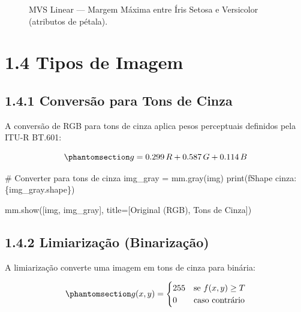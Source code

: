 \documentclass[
  portuguese,
  letterpaper,
  openany,
  oneside,
  12pt,
  a4paper]{book}
\newenvironment{Shaded}{\begin{snugshade}}{\end{snugshade}}
\newcommand{\BuiltInTok}[1]{\textcolor[rgb]{0.00,0.23,0.31}{#1}}
\newcommand{\CommentTok}[1]{\textcolor[rgb]{0.37,0.37,0.37}{#1}}
\newcommand{\NormalTok}[1]{\textcolor[rgb]{0.00,0.23,0.31}{#1}}
\newcommand{\OperatorTok}[1]{\textcolor[rgb]{0.37,0.37,0.37}{#1}}
\newcommand{\SpecialCharTok}[1]{\textcolor[rgb]{0.37,0.37,0.37}{#1}}
\newcommand{\SpecialStringTok}[1]{\textcolor[rgb]{0.13,0.47,0.30}{#1}}
\newcommand{\StringTok}[1]{\textcolor[rgb]{0.13,0.47,0.30}{#1}}
\begin{document}
\begin{tcolorbox}
\begin{figure}[H]
{}

\caption{\label{fig-1-lena}MVS Linear --- Margem Máxima entre Íris
Setosa e Versicolor (atributos de pétala).}

\end{figure}%

\section{1.4 Tipos de Imagem}\label{tipos-de-imagem-1}

\subsection{1.4.1 Conversão para Tons de
Cinza}\label{conversuxe3o-para-tons-de-cinza-2}

A conversão de RGB para tons de cinza aplica pesos perceptuais definidos
pela ITU-R BT.601:

\begin{equation}\phantomsection\label{eq-1-cinza}{g = 0.299\,R + 0.587\,G + 0.114\,B}\end{equation}

\begin{Shaded}
\begin{Highlighting}[]
\CommentTok{\# Converter para tons de cinza}
\NormalTok{img\_gray }\OperatorTok{=}\NormalTok{ mm.gray(img)}
\BuiltInTok{print}\NormalTok{(}\SpecialStringTok{f\textquotesingle{}Shape cinza: }\SpecialCharTok{\{}\NormalTok{img\_gray}\SpecialCharTok{.}\NormalTok{shape}\SpecialCharTok{\}}\SpecialStringTok{\textquotesingle{}}\NormalTok{)}

\NormalTok{mm.show([img, img\_gray], title}\OperatorTok{=}\NormalTok{[}\StringTok{\textquotesingle{}Original (RGB)\textquotesingle{}}\NormalTok{, }\StringTok{\textquotesingle{}Tons de Cinza\textquotesingle{}}\NormalTok{])}
\end{Highlighting}
\end{Shaded}

\subsection{1.4.2 Limiarização
(Binarização)}\label{limiarizauxe7uxe3o-binarizauxe7uxe3o-1}

A limiarização converte uma imagem em tons de cinza para binária:

\begin{equation}\phantomsection\label{eq-1-limiar}{g(x,y) = \begin{cases} 255 & \text{se } f(x,y) \geq T \\ 0 & \text{caso contrário} \end{cases}}\end{equation}


\end{tcolorbox}
\end{document}
